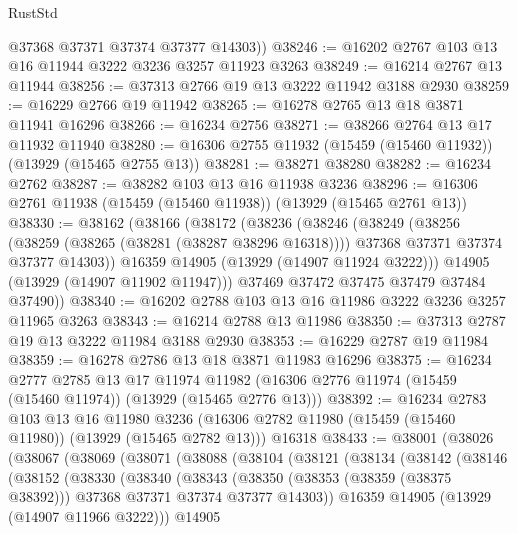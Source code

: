 \begin{lexlean}{RustStd}
\begin{coremodule}
        @37368
        @37371
        @37374
        @37377
        @14303))
@38246 := @16202 @2767 @103 @13 @16 @11944 @3222 @3236 @3257 @11923 @3263
@38249 := @16214 @2767 @13 @11944
@38256 := @37313 @2766 @19 @13 @3222 @11942 @3188 @2930
@38259 := @16229 @2766 @19 @11942
@38265 := @16278 @2765 @13 @18 @3871 @11941 @16296
@38266 := @16234 @2756
@38271 := @38266 @2764 @13 @17 @11932 @11940
@38280 := @16306 @2755 @11932 (@15459 (@15460 @11932)) (@13929 (@15465 @2755 @13))
@38281 := @38271 @38280
@38282 := @16234 @2762
@38287 := @38282 @103 @13 @16 @11938 @3236
@38296 := @16306 @2761 @11938 (@15459 (@15460 @11938)) (@13929 (@15465 @2761 @13))
@38330 := @38162
    (@38166
      (@38172
        (@38236
          (@38246
            (@38249
              (@38256
                (@38259 (@38265 (@38281 (@38287 @38296 @16318))))
                @37368
                @37371
                @37374
                @37377
                @14303))
            @16359
            @14905
            (@13929 (@14907 @11924 @3222)))
          @14905
          (@13929 (@14907 @11902 @11947)))
        @37469
        @37472
        @37475
        @37479
        @37484
        @37490))
@38340 := @16202 @2788 @103 @13 @16 @11986 @3222 @3236 @3257 @11965 @3263
@38343 := @16214 @2788 @13 @11986
@38350 := @37313 @2787 @19 @13 @3222 @11984 @3188 @2930
@38353 := @16229 @2787 @19 @11984
@38359 := @16278 @2786 @13 @18 @3871 @11983 @16296
@38375 := @16234
    @2777
    @2785
    @13
    @17
    @11974
    @11982
    (@16306 @2776 @11974 (@15459 (@15460 @11974)) (@13929 (@15465 @2776 @13)))
@38392 := @16234
    @2783
    @103
    @13
    @16
    @11980
    @3236
    (@16306 @2782 @11980 (@15459 (@15460 @11980)) (@13929 (@15465 @2782 @13)))
    @16318
@38433 := @38001
    (@38026
      (@38067
        (@38069
          (@38071
            (@38088
              (@38104
                (@38121
                  (@38134
                    (@38142
                      (@38146
                        (@38152
                          (@38330
                            (@38340
                              (@38343
                                (@38350
                                  (@38353 (@38359 (@38375 @38392)))
                                  @37368
                                  @37371
                                  @37374
                                  @37377
                                  @14303))
                              @16359
                              @14905
                              (@13929 (@14907 @11966 @3222)))
                            @14905

\end{coremodule}
\end{lexlean}
